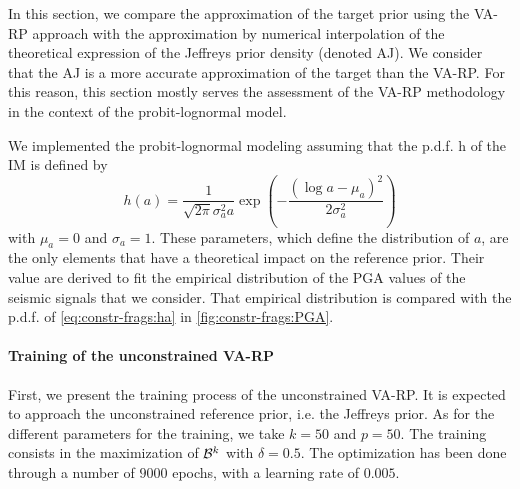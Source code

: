 In this section, we compare the approximation of the target prior using the VA-RP approach with the approximation by numerical interpolation of the theoretical expression of the Jeffreys prior density (denoted AJ).
We consider that the AJ is a more accurate approximation of the target than the VA-RP. For this reason, this section mostly serves the assessment of the VA-RP methodology in the context of the probit-lognormal model.

We implemented the probit-lognormal modeling assuming that the p.d.f. h of the IM is defined by
    \begin{equation}\label{eq:constr-frags:ha}
        h(a) = \frac{1}{\sqrt{2\pi}\sigma_a^2 a}\exp\left(-\frac{(\log a-\mu_a)^2}{2\sigma_a^2}\right)
    \end{equation}
with
$\mu_a=0$ and $\sigma_a=1$. These parameters, which define the distribution of $a$, are the only elements that have a theoretical impact on the reference prior.
Their value are derived to fit the empirical distribution of the PGA values of the seismic signals that we consider. That empirical distribution is compared with the p.d.f. of \cref{eq:constr-frags:ha} in \cref{fig:constr-frags:PGA}.





\paragraph{Training of the unconstrained VA-RP}
First, we present the training process of the unconstrained VA-RP. It is expected to approach the unconstrained reference prior, i.e. the Jeffreys prior. 
As for the different parameters 
for the training, we take $k=50$ and $p=50$. The training consists in the maximization of $\mathcal{B}^k$ with $\delta=0.5$. 
The optimization has been done through a number of $9000$ epochs, with a learning rate of $0.005$.


